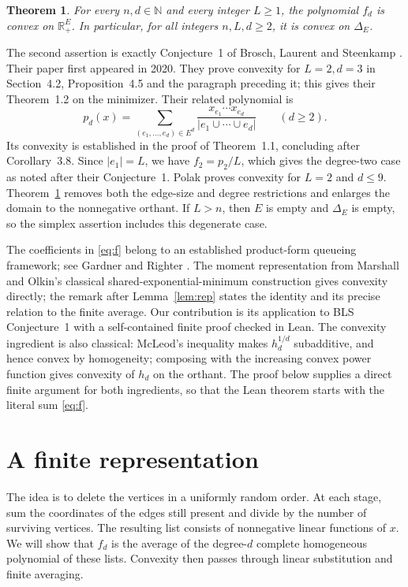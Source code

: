 \documentclass[11pt]{article}
\newtheorem{theorem}{Theorem}
\newcommand{\R}{\mathbb R}
\newcommand{\N}{\mathbb N}
\begin{document}
\begin{theorem}\label{thm:main}
For every $n,d\in\N$ and every integer $L\geq1$, the polynomial $f_d$
is convex on $\R_+^E$. In particular, for all integers $n,L,d\geq2$,
it is convex on $\Delta_E$.
\end{theorem}

The second assertion is exactly Conjecture~1 of Brosch, Laurent and
Steenkamp \cite[Section~4, p.~2242]{BLS}. Their paper first appeared in
2020. They prove convexity for $L=2,d=3$ in Section~4.2, Proposition~4.5
and the paragraph preceding it; this gives their Theorem~1.2 on the
minimizer. Their related polynomial \cite[equation~(1.2)]{BLS} is
\[
 p_d(x)=\sum_{(e_1,\ldots,e_d)\in E^d}
          \frac{x_{e_1}\cdots x_{e_d}}{|e_1\cup\cdots\cup e_d|}
          \qquad(d\geq2).
\]
Its convexity is established in the proof of Theorem~1.1, concluding
after Corollary~3.8. Since $|e_1|=L$, we have $f_2=p_2/L$, which gives
the degree-two case as noted after their Conjecture~1. Polak
\cite[Theorem~1.1]{Polak} proves convexity for $L=2$ and $d\leq9$.
Theorem~\ref{thm:main} removes both the edge-size and degree restrictions
and enlarges the domain to the nonnegative orthant. If $L>n$, then $E$ is
empty and $\Delta_E$ is empty, so the simplex assertion includes this
degenerate case.

The coefficients in \eqref{eq:f} belong to an established product-form
queueing framework; see Gardner and Righter
\cite[Theorem~3.3]{GR}. The moment representation from Marshall and
Olkin's classical shared-exponential-minimum construction
\cite[pp.~14--18, especially (4.2)--(4.6)]{MO} gives convexity directly;
the remark after Lemma~\ref{lem:rep} states the identity and its precise
relation to the finite average. Our contribution is its application to
BLS Conjecture~1 with a self-contained finite proof checked in Lean. The convexity
ingredient is also classical: McLeod's inequality
\cite[Section~1, inequality~(iii)]{McLeod} makes $h_d^{1/d}$ subadditive,
and hence convex by homogeneity; composing with the increasing convex
power function gives convexity of $h_d$ on the orthant.
The proof below supplies a direct finite argument for both ingredients,
so that the Lean theorem starts with the literal sum \eqref{eq:f}.

\section{A finite representation}

The idea is to delete the vertices in a uniformly random order. At each
stage, sum the coordinates of the edges still present and divide by the
number of surviving vertices. The resulting list consists of nonnegative
linear functions of $x$. We will show that $f_d$ is the average of the
degree-$d$ complete homogeneous polynomial of these lists. Convexity then
passes through linear substitution and finite averaging.
\end{document}
